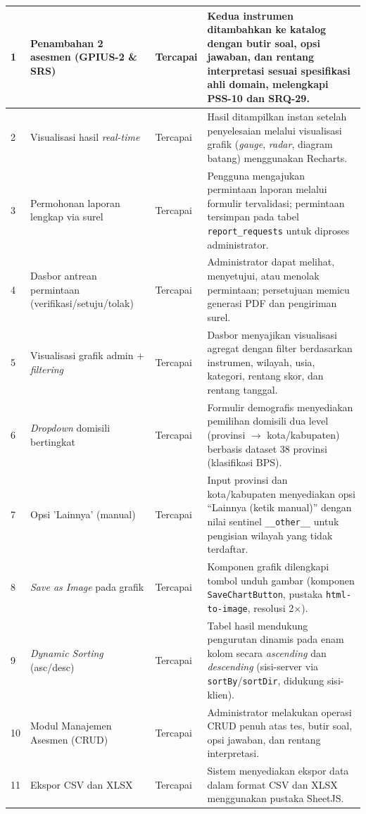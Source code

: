 {\begin{longtable}{|p{0.6cm}|p{4.0cm}|p{1.8cm}|p{5.8cm}|}
  1 & Penambahan 2 asesmen (GPIUS-2 \& SRS) & Tercapai & Kedua instrumen ditambahkan ke katalog dengan butir soal, opsi jawaban, dan rentang interpretasi sesuai spesifikasi ahli domain, melengkapi PSS-10 dan SRQ-29. \\
  \hline
  2 & Visualisasi hasil \textit{real-time} & Tercapai & Hasil ditampilkan instan setelah penyelesaian melalui visualisasi grafik (\textit{gauge}, \textit{radar}, diagram batang) menggunakan Recharts. \\
  \hline
  3 & Permohonan laporan lengkap via surel & Tercapai & Pengguna mengajukan permintaan laporan melalui formulir tervalidasi; permintaan tersimpan pada tabel \texttt{report\_requests} untuk diproses administrator. \\
  \hline
  4 & Dasbor antrean permintaan (verifikasi/setuju/tolak) & Tercapai & Administrator dapat melihat, menyetujui, atau menolak permintaan; persetujuan memicu generasi PDF dan pengiriman surel. \\
  \hline
  5 & Visualisasi grafik admin + \textit{filtering} & Tercapai & Dasbor menyajikan visualisasi agregat dengan filter berdasarkan instrumen, wilayah, usia, kategori, rentang skor, dan rentang tanggal. \\
  \hline
  6 & \textit{Dropdown} domisili bertingkat & Tercapai & Formulir demografis menyediakan pemilihan domisili dua level (provinsi $\rightarrow$ kota/kabupaten) berbasis dataset 38 provinsi (klasifikasi BPS). \\
  \hline
  7 & Opsi 'Lainnya' (manual) & Tercapai & Input provinsi dan kota/kabupaten menyediakan opsi ``Lainnya (ketik manual)'' dengan nilai sentinel \texttt{\_\_other\_\_} untuk pengisian wilayah yang tidak terdaftar. \\
  \hline
  8 & \textit{Save as Image} pada grafik & Tercapai & Komponen grafik dilengkapi tombol unduh gambar (komponen \texttt{SaveChartButton}, pustaka \texttt{html-to-image}, resolusi 2$\times$). \\
  \hline
  9 & \textit{Dynamic Sorting} (asc/desc) & Tercapai & Tabel hasil mendukung pengurutan dinamis pada enam kolom secara \textit{ascending} dan \textit{descending} (sisi-server via \texttt{sortBy}/\texttt{sortDir}, didukung sisi-klien). \\
  \hline
  10 & Modul Manajemen Asesmen (CRUD) & Tercapai & Administrator melakukan operasi CRUD penuh atas tes, butir soal, opsi jawaban, dan rentang interpretasi. \\
  \hline
  11 & Ekspor CSV dan XLSX & Tercapai & Sistem menyediakan ekspor data dalam format CSV dan XLSX menggunakan pustaka SheetJS. \\

\end{longtable}}
